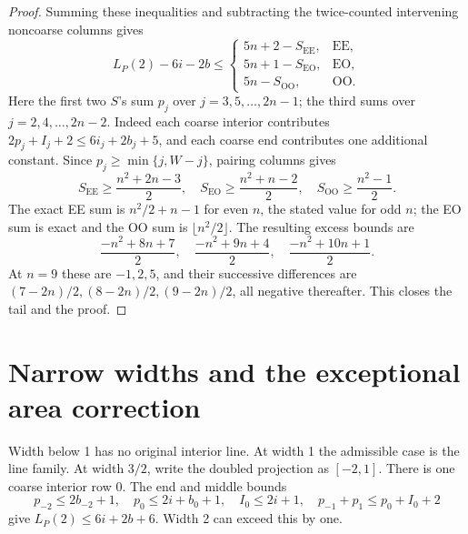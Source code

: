\documentclass[11pt]{article}
\begin{document}
\begin{proof}
Summing these inequalities and subtracting the twice-counted intervening
noncoarse columns gives
\[
 L_P(2)-6i-2b\le
 \begin{cases}
 5n+2-S_{\mathrm{EE}},&\mathrm{EE},\\
 5n+1-S_{\mathrm{EO}},&\mathrm{EO},\\
 5n-S_{\mathrm{OO}},&\mathrm{OO}.
 \end{cases}
\]
Here the first two \(S\)'s sum \(p_j\) over \(j=3,5,\ldots,2n-1\);
the third sums over \(j=2,4,\ldots,2n-2\).
Indeed each coarse interior contributes
\(2p_j+I_j+2\le6i_j+2b_j+5\), and each coarse end contributes one
additional constant.
Since \(p_j\ge\min\{j,W-j\}\), pairing columns gives
\[
 S_{\mathrm{EE}}\ge\frac{n^2+2n-3}{2},\quad
 S_{\mathrm{EO}}\ge\frac{n^2+n-2}{2},\quad
 S_{\mathrm{OO}}\ge\frac{n^2-1}{2}.
\]
The exact EE sum is \(n^2/2+n-1\) for even \(n\), the stated value for odd
\(n\); the EO sum is exact and the OO sum is \(\lfloor n^2/2\rfloor\).
The resulting excess bounds are
\[
 \frac{-n^2+8n+7}{2},\quad
 \frac{-n^2+9n+4}{2},\quad
 \frac{-n^2+10n+1}{2}.
\]
At \(n=9\) these are \(-1,2,5\), and their successive differences are
\((7-2n)/2,(8-2n)/2,(9-2n)/2\), all negative thereafter.
This closes the tail and the proof.
\end{proof}

\section{Narrow widths and the exceptional area correction}\label{sec:narrow}
Width below 1 has no original interior line. At width 1 the admissible case
is the line family. At width \(3/2\), write the doubled projection as
\([-2,1]\). There is one coarse interior row 0. The end and middle bounds
\[
 p_{-2}\le2b_{-2}+1,\quad p_0\le2i+b_0+1,\quad I_0\le2i+1,
 \quad p_{-1}+p_1\le p_0+I_0+2
\]
give \(L_P(2)\le6i+2b+6\). Width 2 can exceed this by one.
\end{document}
